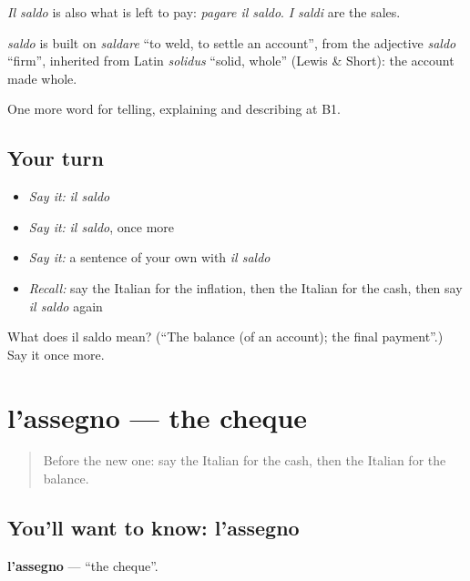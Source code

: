 \emph{Il saldo} is also what is left to pay: \emph{pagare il saldo}. \emph{I saldi} are the sales.

\begin{cousinweb}
\emph{saldo} is built on \emph{saldare} \textquotedblleft{}to weld, to settle an account\textquotedblright{}, from the adjective \emph{saldo} \textquotedblleft{}firm\textquotedblright{}, inherited from Latin \emph{solidus} \textquotedblleft{}solid, whole\textquotedblright{} (Lewis \& Short): the account made whole.
\end{cousinweb}

\begin{grammarlens}[title={What you've built}]
One more word for telling, explaining and describing at B1.
\end{grammarlens}

\subsection*{Your turn}
\begin{itemize}
\raggedright
  \item \emph{Say it:} \emph{il saldo}
  \item \emph{Say it:} \emph{il saldo}, once more
  \item \emph{Say it:} a sentence of your own with \emph{il saldo}
  \item \emph{Recall:} say the Italian for the inflation, then the Italian for the cash, then say \emph{il saldo} again
\end{itemize}

\begin{tcolorbox}[breakable,colback=teal!4,colframe=teal!35!black,title={Before you move on}]
What does il saldo mean? (\textquotedblleft{}The balance (of an account); the final payment\textquotedblright{}.) Say it once more.
\end{tcolorbox}
\section[l'assegno]{l'assegno — the cheque}

\label{lesson:IT-C396-assegno}



\begin{quote}
Before the new one: say the Italian for the cash, then the Italian for the balance.
\end{quote}

\subsection*{You'll want to know: l'assegno}
\textbf{l'assegno} — \textquotedblleft{}the cheque\textquotedblright{}.

